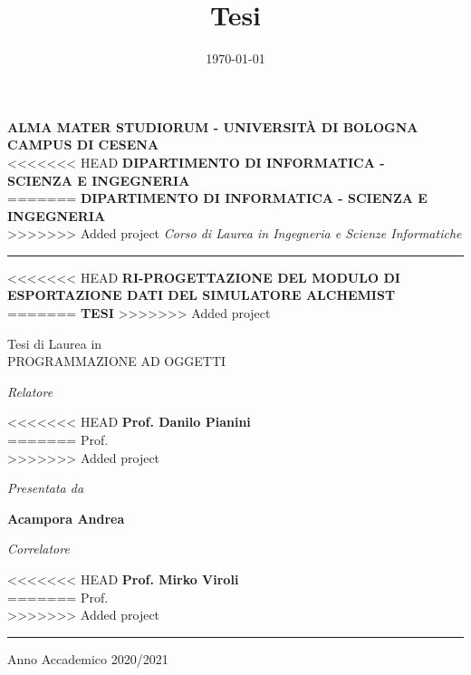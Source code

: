 \title{Tesi}
\date{\today}

\begin{titlepage}
    \begin{center}

\large
\textbf{ALMA MATER STUDIORUM - UNIVERSITÀ DI BOLOGNA} \\
\textbf{CAMPUS DI CESENA} \\
\vspace{0.5cm}
<<<<<<< HEAD
\textbf{DIPARTIMENTO DI INFORMATICA -\\ SCIENZA E INGEGNERIA}\\
=======
\textbf{DIPARTIMENTO DI INFORMATICA - SCIENZA E INGEGNERIA}\\
>>>>>>> Added project
\vspace{0.5cm}
\Large
\textit{Corso di Laurea in Ingegneria e Scienze Informatiche} \\


\vspace{0.7cm}
\noindent\rule{\textwidth}{0.7pt}


\vspace{2.5cm}

<<<<<<< HEAD
\large{\textbf{\MakeUppercase{
Ri-progettazione del modulo di esportazione dati del simulatore Alchemist
}}}
=======
\large{\textbf{ TESI}}
>>>>>>> Added project

\vspace{2cm}

Tesi di Laurea in \\
PROGRAMMAZIONE AD OGGETTI


\vspace{3cm}

\begin{minipage}[t]{7cm}
\flushleft
\textit{{Relatore}}

<<<<<<< HEAD
\textbf{Prof. Danilo Pianini}\\
=======
Prof. \\
>>>>>>> Added project
\end{minipage}
\hfill
\begin{minipage}[t]{7cm}
\flushright
\textit{Presentata da}

\textbf{Acampora Andrea}
\end{minipage}

\flushleft
\textit{{Correlatore}}

<<<<<<< HEAD
\textbf{Prof. Mirko Viroli} \\
=======
Prof. \\
>>>>>>> Added project

\vspace{3cm}
\noindent\rule{\textwidth}{0.7pt}
\vspace{1cm}

\centering
Anno Accademico 2020/2021
    \end{center}
\end{titlepage}
\restoregeometry

